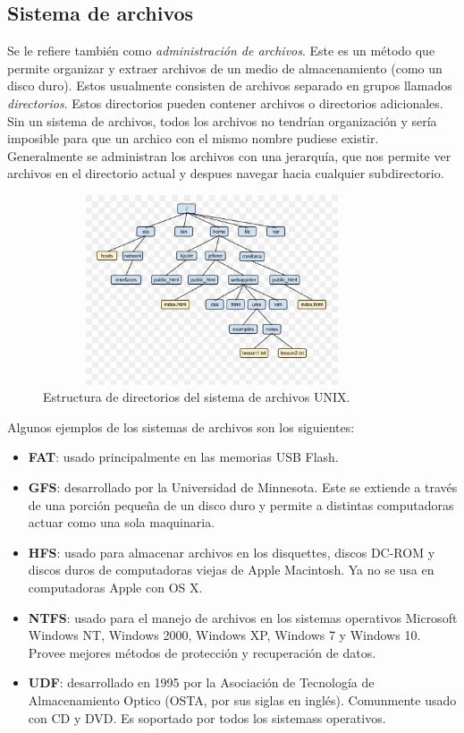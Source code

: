 \documentclass[letterpaper, 12pt]{article}
\begin{document}
\begin{justify}
            \subsection{Sistema de archivos}
        \justify
        Se le refiere también como \emph{administración de archivos}. Este es un método que permite organizar y extraer archivos de un medio de almacenamiento (como un disco duro).
        Estos usualmente consisten de archivos separado en grupos llamados \emph{directorios}. Estos directorios pueden contener archivos o directorios adicionales.
        \\\newline
        Sin un sistema de archivos, todos los archivos no tendrían organización y sería imposible para que un archico con el mismo nombre pudiese existir. Generalmente se administran los
        archivos con una jerarquía, que nos permite ver archivos en el directorio actual y despues navegar hacia cualquier subdirectorio.
        \begin{figure}[H]
            \centering
            \includegraphics[width=10cm,height=5.6cm]{sistemaarchivo.jpg}
            \caption{Estructura de directorios del sistema de archivos UNIX.}
        \end{figure}
        Algunos ejemplos de los sistemas de archivos son los siguientes:
        \begin{itemize}
            \item \textbf{FAT}: usado principalmente en las memorias USB Flash. %
            \item \textbf{GFS}: desarrollado por la Universidad de Minnesota. Este se extiende a través de una porción pequeña de un disco duro y permite a distintas computadoras actuar como una sola maquinaria. %
            \item \textbf{HFS}: usado para almacenar archivos en los disquettes, discos DC-ROM y discos duros de computadoras viejas de Apple Macintosh. Ya no se usa en computadoras Apple con OS X. %
            \item \textbf{NTFS}: usado para el manejo de archivos en los sistemas operativos Microsoft Windows NT, Windows 2000, Windows XP, Windows 7 y Windows 10. Provee mejores métodos de protección y recuperación de datos. %
            \item \textbf{UDF}: desarrollado en 1995 por la Asociación de Tecnología de Almacenamiento Optico (OSTA, por sus siglas en inglés). Comunmente usado con CD y DVD. Es soportado por todos los sistemass operativos. %
        \end{itemize}

\end{justify}
\end{document}
